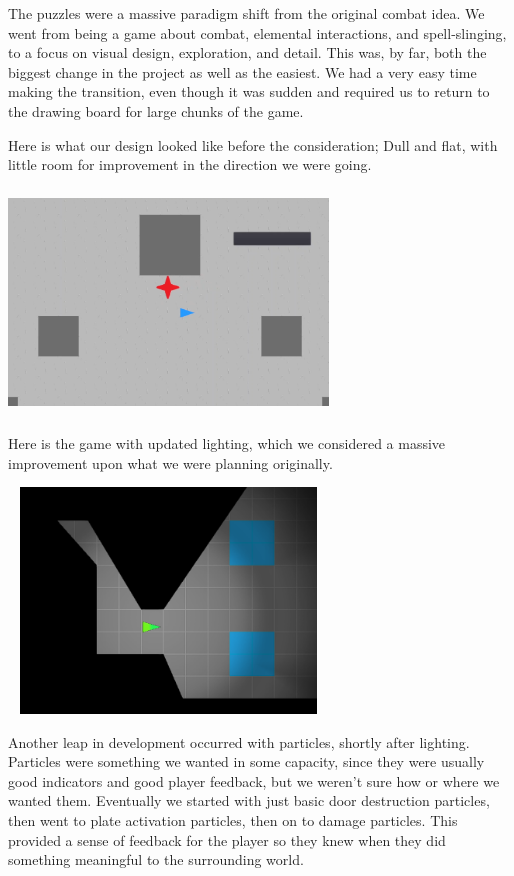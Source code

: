 \documentclass{sigchi}
\begin{document}
The puzzles were a massive paradigm shift from the original combat idea.  We went from being a game about combat, elemental interactions, and spell-slinging, to a focus on visual design, 
exploration, and detail.  This was, by far, both the biggest change in the project as well as the easiest.  We had a very easy time making the transition, even though it was sudden and required us to return 
to the drawing board for large chunks of the game.

Here is what our design looked like before the consideration; Dull and flat, with little room for improvement in the direction we were going.

\includegraphics*[width=8.5cm, height=6cm]{./figures/earlyproj.png}

Here is the game with updated lighting, which we considered a massive improvement upon what we were planning originally.

\includegraphics*[width=8.5cm, height=6cm]{./figures/ourgame.png}

Another leap in development occurred with particles, shortly after lighting.  Particles were something we wanted in some capacity, since they were usually good indicators and good player feedback, but 
we weren't sure how or where we wanted them.  Eventually we started with just basic door destruction particles, then went to plate activation particles, then on to damage particles.  This provided a 
sense of feedback for the player so they knew when they did something meaningful to the surrounding world.
\end{document}
